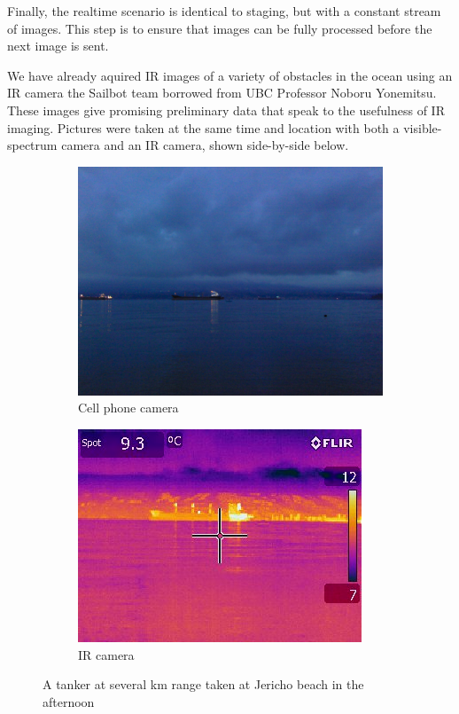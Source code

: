 Finally, the realtime scenario is identical to staging, but with a constant stream of images. This step is to ensure that images can be fully processed before the next image is sent.

We have already aquired IR images of a variety of obstacles in the ocean using an IR camera the Sailbot team borrowed from UBC Professor Noboru Yonemitsu. These images give promising preliminary data that speak to the usefulness of IR imaging. Pictures were taken at the same time and location with both a visible-spectrum camera and an IR camera, shown side-by-side below.

\begin{figure}[H]
\centering
\begin{subfigure}{.5\textwidth}
  \centering
  \includegraphics[width=.8\linewidth]{"./image/jericho-evening-tanker-visible"}
  \caption{Cell phone camera}
  \label{fig:sub1}
\end{subfigure}%
\begin{subfigure}{.5\textwidth}
  \centering
  \includegraphics[width=.8\linewidth]{"./image/jericho-evening-tanker-ir"}
  \caption{IR camera}
  \label{fig:sub2}
\end{subfigure}
\caption{A tanker at several km range taken at Jericho beach in the afternoon}
\label{fig:IR comparison of a tanker in the afternoon}
\end{figure}
 
